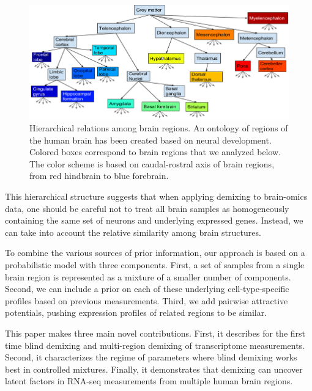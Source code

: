 \documentclass{article} %
\begin{document}
\begin{figure}[!hbt]
  \begin{minipage}[c]{0.65\textwidth}
    \includegraphics[width=\textwidth]{tree}
  \end{minipage}\hfill
  \begin{minipage}[c]{0.3\textwidth}
    \caption{Hierarchical relations among brain regions. An ontology of regions of the human brain has been created based on neural development. Colored boxes correspond to brain regions that we analyzed below. The color scheme is based on caudal-rostral axis of brain regions, from red hindbrain to blue forebrain.} 
    \label{fig:bro}
  \end{minipage}
\end{figure}

This hierarchical structure suggests that when applying demixing to brain-omics data, one should be careful not to treat all brain samples as homogeneously containing the same set of neurons and underlying expressed genes. Instead, we can take into account the relative similarity among brain structures. 

To combine the various sources of prior information, our approach is based on a probabilistic model with three components. First, a set of samples from a single brain region is represented as a mixture of a smaller number of components. Second, we can include a prior on each of these underlying cell-type-specific profiles based on previous measurements. Third, we add pairwise attractive potentials, pushing expression profiles of related regions to be similar.
 
This paper makes three main novel contributions. First, it describes for the first time blind demixing and multi-region demixing of transcriptome measurements. Second, it characterizes the regime of parameters where blind demixing works best in controlled mixtures. Finally, it demonstrates that demixing can uncover latent factors in RNA-seq measurements from multiple human brain regions.
 
\end{document}
